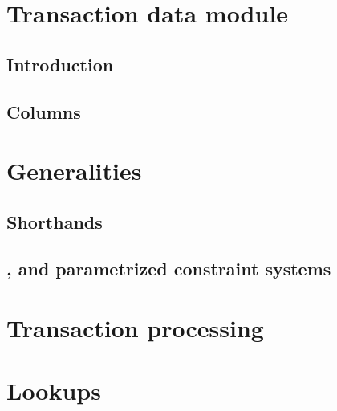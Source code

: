 
\section{Transaction data module}                                           \label{user txn data: generalities}
\subsection{Introduction}                                                   \label{user txn data: intro}                                       
\subsection{Columns}                                                        \label{user txn data: columns}                                     

\section{Generalities}                                                      \label{user txn data: generalities}                                
\subsection{Shorthands}                                                     \label{user txn data: constraints: shorthands}                     
\subsection{\wcpFlag{}, \eucFlag{} and parametrized constraint systems}     \label{user txn data: constraints: comparison constraints}         
\section{Transaction processing}                                            \label{user txn data: processing}                                  
\section{Lookups}                                                           \label{user txn data: lookups}                                     
